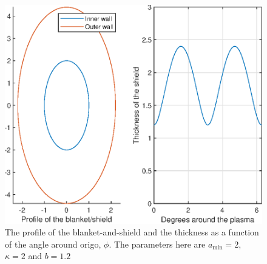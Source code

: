 \begin{figure}[H]
	\centering
	\includegraphics[width=.5\textwidth]{MatlabFigures/ShieldThickness/ShieldThickness.eps}
	\caption{The profile of the blanket-and-shield and the thickness as a function of the angle around origo, \(\phi\). The parameters here are \(a_{\min}=2\), \(\kappa=2\) and \(b=1.2\)}
	\label{ShTh}
\end{figure}
